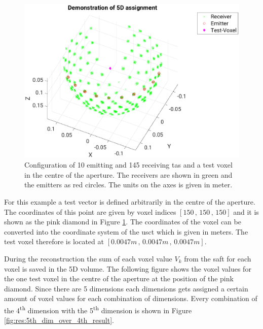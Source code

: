 \begin{figure}[H]
    \centering
    \includegraphics[width=0.89\linewidth]{Graphics/Results/4d_5d/5thDim_over_4thDim_150_150_150_apertur.eps}
    \caption{Configuration of 10 emitting and 145 receiving \ac{tas} and a test voxel in the centre of the aperture. The receivers are shown in green and the emitters as red circles. The units on the axes is given in meter. }
    \label{fig:res:5th_dim_over_4th_aperture}
\end{figure}

 For this example a test vector is defined arbitrarily in the centre of the aperture. The coordinates of this point are given by voxel indices $[150\, , \, 150\, , \, 150]$ and it is shown as the pink diamond in Figure \ref{fig:res:5th_dim_over_4th_aperture}. The coordinates of the voxel can be converted into the coordinate system of the \ac{usct} which is given in meters. The test voxel therefore is located at $[0.0047m\, , \, 0.0047m\, , \, 0.0047m]$.

 During the reconstruction the sum of each voxel value $V_k$ from the \ac{saft} for each voxel is saved in the 5D volume. The following figure shows the voxel values for the one test voxel in the centre of the aperture at the position of the pink diamond. Since there are 5 dimensions each dimensions gets assigned a certain amount of voxel values for each combination of dimensions. Every combination of the 4\textsuperscript{th} dimension with the 5\textsuperscript{th} dimension is shown in Figure \ref{fig:res:5th_dim_over_4th_result}.
 
